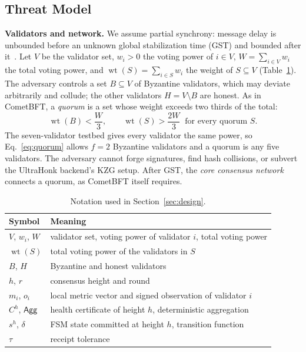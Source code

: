 \subsection{Threat Model}
\label{subsec:threat-model}

\textbf{Validators and network.} We assume partial synchrony: message delay
is unbounded before an unknown global stabilization time (GST) and bounded
after it~\cite{dwork1988consensus}. Let $V$ be the validator set, $w_i > 0$
the voting power of $i \in V$, $W = \sum_{i \in V} w_i$ the total voting
power, and $\operatorname{wt}(S) = \sum_{i \in S} w_i$ the weight of
$S \subseteq V$ (Table~\ref{tab:notation}). The adversary controls a set
$B \subseteq V$ of Byzantine validators, which may deviate arbitrarily and
collude; the other validators $H = V \setminus B$ are honest. As in
CometBFT, a \emph{quorum} is a set whose weight exceeds two thirds of the
total:
\begin{equation}
\operatorname{wt}(B) < \frac{W}{3}, \qquad
\operatorname{wt}(S) > \frac{2W}{3} \ \text{ for every quorum } S.
\label{eq:quorum}
\end{equation}
The seven-validator testbed gives every validator the same power, so
Eq.~\eqref{eq:quorum} allows $f{=}2$ Byzantine validators and a quorum is any
five validators. The adversary cannot forge signatures, find hash collisions,
or subvert the UltraHonk backend's KZG setup. After GST, the \emph{core
consensus network} connects a quorum, as CometBFT itself requires.

\begin{table}[h]
\caption{Notation used in Section~\ref{sec:design}.}
\label{tab:notation}
\centering
\footnotesize
\begin{tabular}{@{}ll@{}}
\toprule
\textbf{Symbol} & \textbf{Meaning} \\
\midrule
$V$, $w_i$, $W$ & validator set, voting power of validator $i$, total voting power \\
$\operatorname{wt}(S)$ & total voting power of the validators in $S$ \\
$B$, $H$ & Byzantine and honest validators \\
$h$, $r$ & consensus height and round \\
$m_i$, $o_i$ & local metric vector and signed observation of validator $i$ \\
$C^{h}$, $\mathsf{Agg}$ & health certificate of height $h$, deterministic aggregation \\
$s^{h}$, $\delta$ & FSM state committed at height $h$, transition function \\
$\tau$ & receipt tolerance \\
\bottomrule
\end{tabular}
\end{table}

